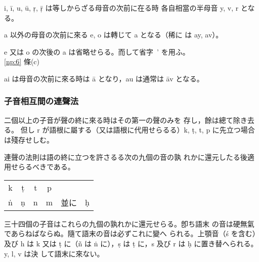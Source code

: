 \numberParagraph \label{np:13}
i, ī, u, ū, ṛ, ṝ は等しからざる母音の次前に在る時
各自相當の半母音 y, v, r となる。

\numberParagraph \label{np:14}
a 以外の母音の次前に來る e, o は轉じて a となる（稀に
は ay, av）。

e 又は o の次後の a は省略せらる。而して省字 \,' を用ふ。\\
\hfill \ref{np:6} 條(c)

\numberParagraph
ai は母音の次前に來る時は ā となり，au は通常は āv となる。


\subsubsection{子音相互間の連聲法}
\numberParagraph
二個以上の子音が聲の終に來る時はその第一の聲のみを
存し，餘は總て除き去る。
但し r が語根に屬する（又は語根に代用せらるる）k, ṭ, t, p
に先立つ場合は殘存せしむ。

\numberParagraph \label{np:17}
連聲の法則は語の終に立つを許さるる次の九個の音の孰
れかに還元したる後適用せらるべきである。

\begin{center}
\begin{tabular}{cccccc}
  k & ṭ & t & p & & \\
  ṅ & ṇ & n & m & 並に & ḥ
\end{tabular}
\end{center}
三十四個の子音はこれらの九個の孰れかに還元せらる。卽ち語末
の音は硬無氣であらねばならぬ。隨て語末の音は必ずこれに變へ
られる。上顎音（ś を含む）及び h は k 又は ṭ に（ñ は ṅ
に），ṣ は ṭ に，s 及び r は ḥ に置き替へられる。y, l, v は決
して語末に來ない。

